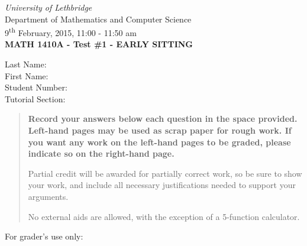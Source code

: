 \documentclass[12pt]{article}
\newcommand{\skipline}{\vspace{12pt}}
\begin{document}
\author{Instructor: Sean Fitzpatrick}
\thispagestyle{plain}
\begin{center}
\emph{University of Lethbridge}\\
Department of Mathematics and Computer Science\\
9\textsuperscript{th} February, 2015, 11:00 - 11:50 am\\
{\bf MATH 1410A - Test \#1 - EARLY SITTING}\\
\end{center}
\skipline \skipline \skipline \noindent \skipline
Last Name:\underline{\hspace{353pt}}\\
\skipline
First Name:\underline{\hspace{350pt}}\\
\skipline
Student Number:\underline{\hspace{323pt}}\\
\skipline
Tutorial Section: \underline{\hspace{320pt}}\\


\vspace{0.5in}


\begin{quote}
 {\bf Record your answers below each question in the space provided.    Left-hand pages may be used as scrap paper for rough work.  If you want any work on the left-hand pages to be graded, please indicate so on the right-hand page.
 
 \bigskip
 
Partial credit will be awarded for partially correct work, so be sure to show your work, and include all necessary justifications needed to support your arguments.

\bigskip

No external aids are allowed, with the exception of a 5-function calculator.}
\end{quote}


\vspace{0.5in}

For grader's use only:
\end{document}

